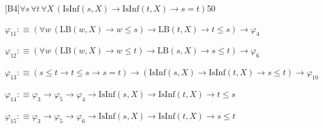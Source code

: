 \begin{fullproof}{[B4]}{$\forall s\,\forall t\,\forall X\,(\mathrm{IsInf}(s,X) \to \mathrm{IsInf}(t,X) \to s = t)$}{50}
\begin{abbrevlist}
\item $\varphi_{11} :\equiv (\forall w\,(\mathrm{LB}(w,X) \to w \leq s) \to \mathrm{LB}(t,X) \to t \leq s) \to \varphi_{4}$
\item $\varphi_{12} :\equiv (\forall w\,(\mathrm{LB}(w,X) \to w \leq t) \to \mathrm{LB}(s,X) \to s \leq t) \to \varphi_{6}$
\item $\varphi_{13} :\equiv (s \leq t \to t \leq s \to s = t) \to (\mathrm{IsInf}(s,X) \to \mathrm{IsInf}(t,X) \to s \leq t) \to \varphi_{10}$
\item $\varphi_{14} :\equiv \varphi_{3} \to \varphi_{5} \to \varphi_{4} \to \mathrm{IsInf}(s,X) \to \mathrm{IsInf}(t,X) \to t \leq s$
\item $\varphi_{15} :\equiv \varphi_{3} \to \varphi_{5} \to \varphi_{6} \to \mathrm{IsInf}(s,X) \to \mathrm{IsInf}(t,X) \to s \leq t$
\end{abbrevlist}
\end{fullproof}
